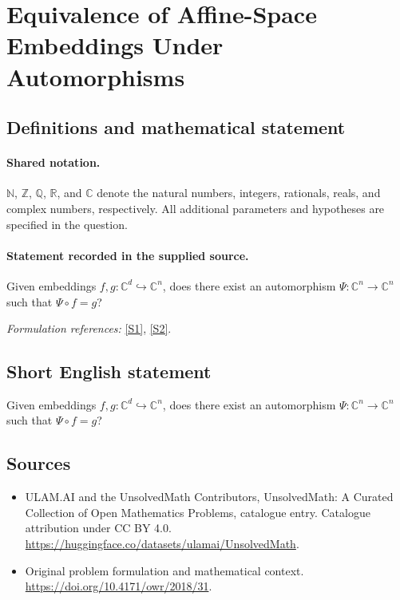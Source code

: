 \documentclass[11pt]{article}
\newcommand{\sref}[2]{\hyperlink{source:#1:#2}{[S#2]}}
\begin{document}
\section{Equivalence of Affine-Space Embeddings Under Automorphisms}\label{statement}

\subsection{Definitions and mathematical statement}

\paragraph{Shared notation.}$\mathbb N$, $\mathbb Z$, $\mathbb Q$, $\mathbb R$, and $\mathbb C$ denote the natural numbers, integers, rationals, reals, and complex numbers, respectively. All additional parameters and hypotheses are specified in the question.


\paragraph{Statement recorded in the supplied source.}
Given embeddings $f,g:\mathbb C^d\hookrightarrow\mathbb C^n$, does there exist an automorphism $\Psi:\mathbb C^n\to\mathbb C^n$ such that $\Psi\circ f=g$?
\par\smallskip\textit{Formulation references:} \sref{statement}{1}, \sref{statement}{2}.
\subsection{Short English statement}
Given embeddings $f,g:\mathbb C^d\hookrightarrow\mathbb C^n$, does there exist an automorphism $\Psi:\mathbb C^n\to\mathbb C^n$ such that $\Psi\circ f=g$?
\subsection{Sources}
\begin{itemize}
\item[\hypertarget{source:statement:1}{S1}] ULAM.AI and the UnsolvedMath Contributors, UnsolvedMath: A Curated Collection of Open Mathematics Problems, catalogue entry. Catalogue attribution under CC BY 4.0.
\url{https://huggingface.co/datasets/ulamai/UnsolvedMath}.
\item[\hypertarget{source:statement:2}{S2}] Original problem formulation and mathematical context.
\url{https://doi.org/10.4171/owr/2018/31}.
\end{itemize}
\label{end:statement}
\end{document}
